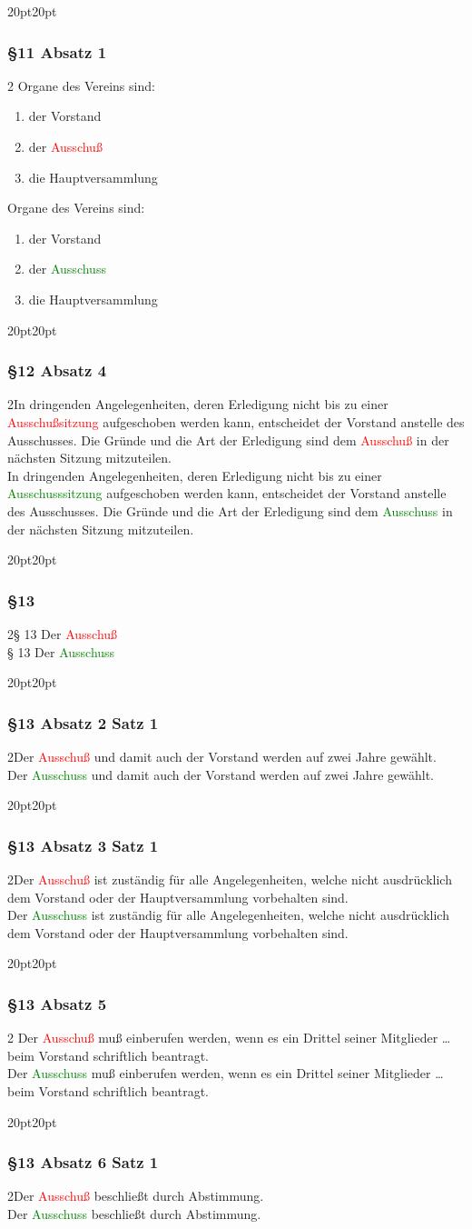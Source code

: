 \documentclass[10pt,a4paper,parskip=half]{scrartcl}
\newcommand{\new}[1]{\textcolor{Green}{#1}}
\newcommand{\old}[1]{\textcolor{Red}{#1}}
\newcommand{\change}[1]{
  \begin{adjustwidth}{20pt}{20pt}
    #1
  \end{adjustwidth}
}
\newcommand{\compare}[3]{\change{\subsubsection*{#1}\begin{multicols}{2}#2\columnbreak\\#3\end{multicols}}}
\begin{document}
\change{
  \subsubsection*{§11 Absatz 1}\begin{multicols}{2}
    Organe des Vereins sind:
    \begin{enumerate}[noitemsep]
      \item der Vorstand
      \item der \old{Ausschuß}
      \item die Hauptversammlung
    \end{enumerate}
    \columnbreak
    Organe des Vereins sind:
    \begin{enumerate}[noitemsep]
      \item der Vorstand
      \item der \new{Ausschuss}
      \item die Hauptversammlung
    \end{enumerate}
  \end{multicols}
}

\clearpage
\compare{§12 Absatz 4}
{In dringenden Angelegenheiten,
  deren Erledigung nicht bis zu einer \old{Ausschußsitzung} aufgeschoben werden kann,
  entscheidet der Vorstand anstelle des Ausschusses.
  Die Gründe und die Art der Erledigung sind dem \old{Ausschuß} in der nächsten Sitzung mitzuteilen.
}{
  In dringenden Angelegenheiten,
  deren Erledigung nicht bis zu einer \new{Ausschusssitzung} aufgeschoben werden kann,
  entscheidet der Vorstand anstelle des Ausschusses.
  Die Gründe und die Art der Erledigung sind dem \new{Ausschuss} in der nächsten Sitzung mitzuteilen.
}

\compare{§13}
{§ 13 Der \old{Ausschuß}}
{§ 13 Der \new{Ausschuss}}

\compare{§13 Absatz 2 Satz 1}
{Der \old{Ausschuß} und damit auch der Vorstand werden auf zwei Jahre gewählt.}
{Der \new{Ausschuss} und damit auch der Vorstand werden auf zwei Jahre gewählt.}

\compare{§13 Absatz 3 Satz 1}
{Der \old{Ausschuß} ist zuständig für alle Angelegenheiten, welche nicht ausdrücklich dem Vorstand oder der Hauptversammlung vorbehalten sind.}
{Der \new{Ausschuss} ist zuständig für alle Angelegenheiten, welche nicht ausdrücklich dem Vorstand oder der Hauptversammlung vorbehalten sind.}

\compare{§13 Absatz 5}{
  Der \old{Ausschuß} muß einberufen werden,
  wenn es ein Drittel seiner Mitglieder \dots beim Vorstand schriftlich beantragt.
}
{Der \new{Ausschuss} muß einberufen werden,
  wenn es ein Drittel seiner Mitglieder \dots beim Vorstand schriftlich beantragt.}
\compare{§13 Absatz 6 Satz 1}
{Der \old{Ausschuß} beschließt durch Abstimmung.}
{Der \new{Ausschuss} beschließt durch Abstimmung.}
\end{document}
